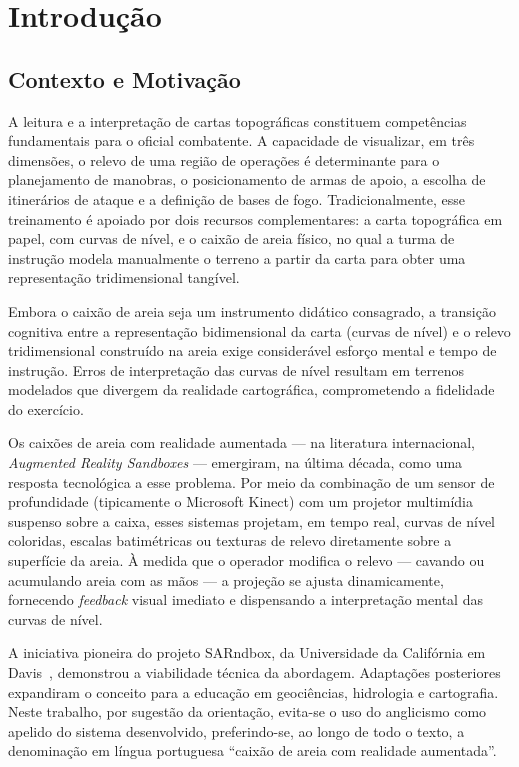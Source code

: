 
\chapter{Introdução}
\label{cap:intro}

\section{Contexto e Motivação}
\label{sec:contexto}

A leitura e a interpretação de cartas topográficas constituem competências
fundamentais para o oficial combatente. A capacidade de visualizar, em três
dimensões, o relevo de uma região de operações é determinante para o
planejamento de manobras, o posicionamento de armas de apoio, a escolha de
itinerários de ataque e a definição de bases de fogo. Tradicionalmente, esse
treinamento é apoiado por dois recursos complementares: a carta
topográfica em papel, com curvas de nível, e o caixão de areia
físico, no qual a turma de instrução modela manualmente o terreno a partir
da carta para obter uma representação tridimensional tangível.

Embora o caixão de areia seja um instrumento didático consagrado, a
transição cognitiva entre a representação bidimensional da carta
(curvas de nível) e o relevo tridimensional construído na areia exige
considerável esforço mental e tempo de instrução. Erros de interpretação
das curvas de nível resultam em terrenos modelados que divergem da
realidade cartográfica, comprometendo a fidelidade do exercício.

Os caixões de areia com realidade aumentada — na literatura
internacional, \textit{Augmented Reality Sandboxes} — emergiram, na última
década, como uma resposta tecnológica a esse problema. Por meio da
combinação de um sensor de profundidade (tipicamente o
Microsoft Kinect) com um projetor multimídia suspenso
sobre a caixa, esses sistemas projetam, em tempo real, curvas de nível
coloridas, escalas batimétricas ou texturas de relevo diretamente sobre a
superfície da areia. À medida que o operador modifica o relevo — cavando ou
acumulando areia com as mãos — a projeção se ajusta dinamicamente,
fornecendo \emph{feedback} visual imediato e dispensando a interpretação
mental das curvas de nível.

A iniciativa pioneira do projeto SARndbox, da Universidade da
Califórnia em Davis~\cite{sarndbox}, demonstrou a viabilidade técnica da
abordagem. Adaptações posteriores expandiram o conceito para a educação
em geociências, hidrologia e cartografia. Neste trabalho, por sugestão da
orientação, evita-se o uso do anglicismo como apelido do sistema
desenvolvido, preferindo-se, ao longo de todo o texto, a denominação em
língua portuguesa ``caixão de areia com realidade aumentada''.

